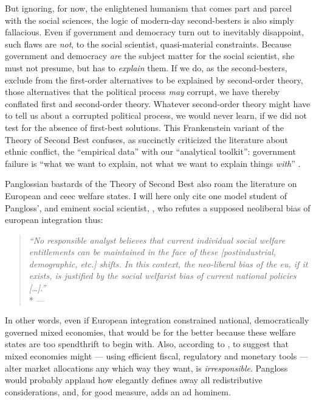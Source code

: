 But ignoring, for now, the enlightened humanism that comes part and parcel with the social sciences, the logic of modern-day second-besters is also simply fallacious.
Even if government and democracy turn out to inevitably disappoint, such flaws are \emph{not}, to the social scientist, quasi-material constraints.
Because government and democracy \emph{are} the subject matter for the social scientist, she must not presume, but has to \emph{explain} them.
If we do, as the second-besters, exclude from the first-order alternatives to be explained by second-order theory, those alternatives that the political process \emph{may} corrupt, we have thereby conflated first and second-order theory.
Whatever second-order theory might have to tell us about a corrupted political process, we would never learn, if we did not test for the absence of first-best solutions.
This Frankenstein variant of the Theory of Second Best confuses, as \cite{Brubaker-2002-aa} succinctly criticized the literature about ethnic conflict, the ``empirical data'' with our ``analytical toolkit'':
government failure is ``what we want to explain, not what we want to explain things \emph{with}'' \citeyearpar[165, emphasis in original]{Brubaker-2002-aa}.

Panglossian bastards of the Theory of Second Best also roam the literature on European and \gls{ceec} welfare states.
I will here only cite one model student of Pangloss', and eminent social scientist, \citeauthor{Moravcsik-2002-aa}, who refutes a supposed neoliberal bias of european integration thus:

\begin{quote}
	\emph{``No responsible analyst believes that current individual social welfare entitlements can be maintained in the face of these [postindustrial, demographic, etc.] shifts.
	In this context, the neo-liberal bias of the \gls{eu}, if it exists, is justified by the social welfarist bias of current national policies [\ldots].''}
	\\*
	--- \citet[618]{Moravcsik-2002-aa}
\end{quote}

In other words, even if European integration constrained national, democratically governed mixed economies, that would be for the better because these welfare states are too spendthrift to begin with.
Also, according to \citeauthor{Moravcsik-2002-aa}, to suggest that mixed economies might --- using efficient fiscal, regulatory and monetary tools --- alter market allocations any which way they want, is \emph{irresponsible}.
Pangloss would probably applaud how elegantly \citeauthor{Moravcsik-2002-aa} defines away all redistributive considerations, and, for good measure, adds an ad hominem.

